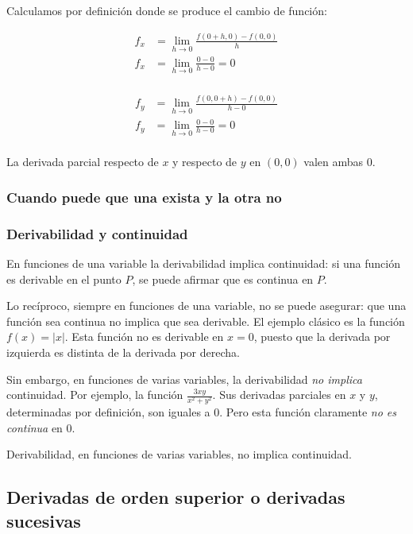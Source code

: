 Calculamos por definición donde se produce el cambio de función:

\begin{align*}
     f_x & = \lim_{h \to 0}\frac{f(0 + h,0) - f(0,0)}{h} \\
     f_x & = \lim_{h \to 0}\frac{0 - 0}{h - 0} = \boxed{0} \\
\end{align*}

\begin{align*}
     f_y & = \lim_{h \to 0}\frac{f(0,0 + h) - f(0,0)}{h - 0} \\
     f_y & = \lim_{h \to 0}\frac{0 - 0}{h - 0} = \boxed{0} \\
\end{align*}

La derivada parcial respecto de \(x\) y respecto de \(y\) en \((0,0)\) valen 
ambas 0.

\subsubsection{Cuando puede que una exista y la otra no}

\subsubsection{Derivabilidad y continuidad}

En funciones de una variable la derivabilidad implica continuidad:
si una función es derivable en el punto \(P\),
se puede afirmar que es continua en \(P\).

Lo recíproco, siempre en funciones de una variable,
no se puede asegurar:
que una función sea continua no implica que sea derivable.
El ejemplo clásico es la función \(f(x) = |x|\). 
Esta función no es derivable en \(x = 0\),
puesto que la derivada por izquierda es distinta de la derivada por derecha.

Sin embargo,
en funciones de varias variables,
la derivabilidad \textit{no implica} continuidad.
Por ejemplo, la función \(\frac{3xy}{x^{2} + y^{2}}\).
Sus derivadas parciales en \(x\) y \(y\),
determinadas por definición,
son iguales a 0.
Pero esta función claramente \textit{no es continua} en 0.

Derivabilidad, 
en funciones de varias variables,
no implica continuidad.

\subsection{Derivadas de orden superior o derivadas sucesivas}

